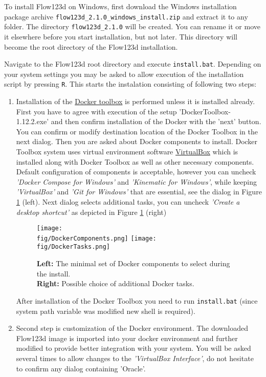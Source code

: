 \documentclass[12pt,a4paper]{report}
\def\fig{figures}
\begin{document}
To install Flow123d on Windows, first download the Windows installation package archive \verb'flow123d_2.1.0_windows_install.zip' and extract it to any folder.
The directory \verb'flow123d_2.1.0' will be created. You can rename it or move it elsewhere before you start installation, but not later. 
This directory will become the root directory of the Flow123d installation. 

Navigate to the Flow123d root directory and execute \verb'install.bat'. Depending on your system settings you may be asked to allow 
execution of the installation script by pressing \verb'R'. This starts the instalation consisting of following two steps:
\begin{enumerate}
	\item Installation of the \href{https://www.docker.com/products/docker-toolbox}{Docker toolbox} is performed unless it is installed already. 
	First you have to agree with execution of the setup 'DockerToolbox-1.12.2.exe' and then
	confirm installation of the Docker with the 'next' button. You can confirm or modify destination location of the Docker Toolbox in the next dialog.
        Then you are asked about Docker components to install. Docker Toolbox system uses virtual environment software 
        \href{https://www.virtualbox.org/}{VirtualBox} which is installed along with Docker Toolbox as well as other necessary components.
        Default configuration of components is acceptable, however you can uncheck 
        \emph{'Docker Compose for Windows'} and \emph{'Kinematic for Windows'}, while keeping \emph{'VirtualBox'} and \emph{'Git for Windows'} that are essential,
        see the dialog in Figure \ref{fig:DockerComponents} (left). Next dialog selects additional tasks, you can uncheck \emph{'Create a desktop shortcut'} as 
        depicted in Figure \ref{fig:DockerComponents} (right)
        \begin{figure}
          \center  
          \texttt{[image: \\fig/DockerComponents.png]}%
          \hspace{2ex}
          \texttt{[image: \\fig/DockerTasks.png]}
          \caption{{\bf Left:} The minimal set of Docker components to select during the install.\\
                   {\bf Right:} Possible choice of additional Docker tasks.} 
          \label{fig:DockerComponents}
        \end{figure}
	After installation of the Docker Toolbox you need to run \verb'install.bat' (since system path variable was modified new shell is required). 
	\item Second step is customization of the Docker environment. The downloaded Flow123d image is imported into your docker environment 
	and further modified to provide better integration with your system.
	You will be asked several times to allow changes to the \emph{'VirtualBox Interface'}, do not hesitate to confirm any dialog containing 'Oracle'.
		

\end{enumerate}
\end{document}
